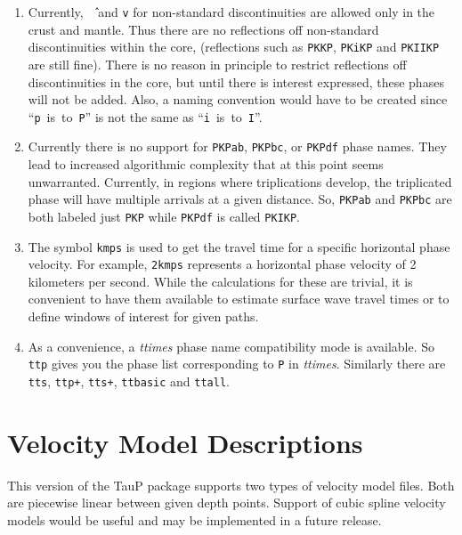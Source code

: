 \begin{enumerate}
\item 
Currently, \texttt{\^\,} and \texttt{v} for non-standard
discontinuities are allowed only in 
the crust and mantle. Thus there are no reflections off non-standard
discontinuities within the core, (reflections such as \texttt{PKKP}, 
\texttt{PKiKP} and \texttt{PKIIKP} are
still fine). 
There is no 
reason in principle to restrict reflections off discontinuities in the
core, but until there is interest expressed, these phases will not be added.
Also, a naming convention would have to be created since 
``\texttt{p}~is~to~\texttt{P}'' is not the same as 
``\texttt{i}~is~to~\texttt{I}''.

\item Currently there is no support for \texttt{PKPab}, \texttt{PKPbc}, 
or \texttt{PKPdf} phase names. 
They lead to increased algorithmic complexity that at this point seems 
unwarranted.
Currently, in regions where triplications develop, the triplicated phase will have multiple
arrivals at a given distance.
So, \texttt{PKPab} and \texttt{PKPbc} are
both labeled just \texttt{PKP} while \texttt{PKPdf} is called \texttt{PKIKP}.

\item \label{kmps} 
The symbol \texttt{kmps} is used to get the travel time for a
specific horizontal phase velocity.  
For example, \texttt{2kmps} represents a horizontal phase
velocity of 2 kilometers per second. 
While the calculations for these are trivial, it is convenient
to have them available to estimate surface wave travel times or to define windows of
interest for given paths.

\item As a convenience, a \textit{ttimes} phase name compatibility mode is available. 
So \texttt{ttp} gives
you the phase list corresponding to \texttt{P} in \textit{ttimes}. 
Similarly there are \texttt{tts}, \texttt{ttp+}, 
\texttt{tts+}, \texttt{ttbasic} and \texttt{ttall}.

\end{enumerate}

\section*{Velocity Model Descriptions}

This version of the TauP package supports two types of velocity model files.
Both are piecewise linear between given depth points.
Support of cubic spline velocity models would be useful and may be implemented in a
future release.

